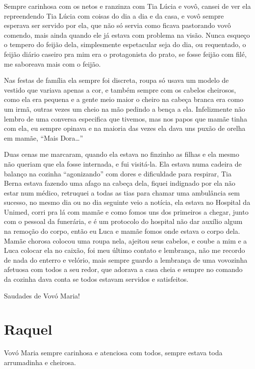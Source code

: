 \documentclass[
  brazil,
  a6paper,
  oneside,
  landscape,
  14pt]{scrbook}
\begin{document}
Sempre carinhosa com os netos e ranzinza com Tia Lúcia e vovô, cansei de
ver ela repreendendo Tia Lúcia com coisas do dia a dia e da casa, e vovô
sempre esperava ser servido por ela, que não só servia como ficava
pastorando vovô comendo, mais ainda quando ele já estava com problema na
visão. Nunca esqueço o tempero do feijão dela, simplesmente espetacular
seja do dia, ou requentado, o feijão diário caseiro pra mim era o
protagonista do prato, se fosse feijão com filé, me saboreava mais com o
feijão.

Nas festas de família ela sempre foi discreta, roupa só usava um modelo
de vestido que variava apenas a cor, e também sempre com os cabelos
cheirosos, como ela era pequena e a gente meio maior o cheiro na cabeça
branca era como um irmã, outras vezes um cheio na mão pedindo a bença a
ela. Infelizmente não lembro de uma conversa especifica que tivemos, mas
nos papos que mamãe tinha com ela, eu sempre opinava e na maioria das
vezes ela dava uns puxão de orelha em mamãe, ``Mais Dora\ldots{}''

Duas cenas me marcaram, quando ela estava no finzinho as filhas e ela
mesmo não queriam que ela fosse internada, e fui visitá-la. Ela estava
numa cadeira de balanço na cozinha ``agonizando'' com dores e
dificuldade para respirar, Tia Berna estava fazendo uma afago na cabeça
dela, fiquei indignado por ela não estar num médico, retruquei a todas
as tias para chamar uma ambulância sem sucesso, no mesmo dia ou no dia
seguinte veio a notícia, ela estava no Hospital da Unimed, corri pra lá
com mamãe e como fomos uns dos primeiros a chegar, junto com o pessoal
da funerária, e é um protocolo do hospital não dar auxílio algum na
remoção do corpo, então eu Luca e mamãe fomos onde estava o corpo dela.
Mamãe chorosa colocou uma roupa nela, ajeitou seus cabelos, e coube a
mim e a Luca colocar ela no caixão, foi meu último contato e lembrança,
não me recordo de nada do enterro e velório, mais sempre guardo a
lembrança de uma vovozinha afetuosa com todos a seu redor, que adorava a
casa cheia e sempre no comando da cozinha dava conta se todos estavam
servidos e satisfeitos.

Saudades de Vovó Maria!

\hypertarget{raquel}{%
\section{Raquel}\label{raquel}}

Vovó Maria sempre carinhosa e atenciosa com todos, sempre estava toda
arrumadinha e cheirosa.
\end{document}
